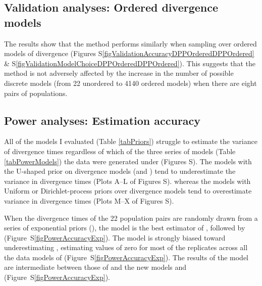 \subsection{Validation analyses: Ordered divergence models}
The results show that the method performs similarly when sampling over ordered
models of divergence
(Figures S\ref{figValidationAccuracyDPPOrderedDPPOrdered} \&
S\ref{figValidationModelChoiceDPPOrderedDPPOrdered}).
This suggests that the method is not adversely affected by the increase
in the number of possible discrete models (from 22 unordered to 4140 ordered
models) when there are eight pairs of populations.

\subsection{Power analyses: Estimation accuracy}
All of the models I evaluated (Table \ref{tabPriors}) struggle to estimate the
variance of divergence times \divTimeDispersion regardless of which of the
three series of models (Table \ref{tabPowerModels}) the data were generated
under
(Figures
S).
The models with the U-shaped prior on divergence models (\modelOld and
\modelUshaped) tend to underestimate the variance in divergence times 
(Plots A--L of Figures
S).
whereas the models with Uniform or Dirichlet-process priors over divergence
models tend to overestimate variance in divergence times
(Plots M--X of Figures
S).

When the divergence times of the 22 population pairs are randomly drawn from a
series of exponential priors (\powerSeriesExp), the \modelDPP model is the
best estimator of \divTimeDispersion, followed by \modelUniform
(Figure~S\ref{figPowerAccuracyExp}).
The \modelOld model is strongly biased toward underestimating
\divTimeDispersion, estimating values of zero for most of the replicates across
all the data models of \powerSeriesExp (Figure~S\ref{figPowerAccuracyExp}).
The results of the \modelUshaped model are intermediate between those of
\modelOld and the new models \modelDPP and \modelUniform
(Figure~S\ref{figPowerAccuracyExp}).

